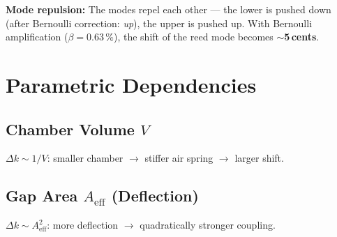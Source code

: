 \documentclass[11pt,a4paper]{article}
\begin{document}
\textbf{Mode repulsion:} The modes repel each other --- the lower is pushed down (after Bernoulli correction: \textit{up}), the upper is pushed up. With Bernoulli amplification ($\beta = 0{.}63\,\%$), the shift of the reed mode becomes \textbf{$\sim$5\,cents}.

\section{Parametric Dependencies}

\subsection{Chamber Volume $V$}

$\Delta k \sim 1/V$: smaller chamber $\to$ stiffer air spring $\to$ larger shift.

\begin{table}[H]
\centering\small
{}
\caption{Frequency shift as a function of chamber volume}
\end{table}

\subsection{Gap Area $A_\text{eff}$ (Deflection)}

$\Delta k \sim A_\text{eff}^2$: more deflection $\to$ quadratically stronger coupling.

\begin{table}[H]
\centering\small
{}
\caption{Frequency shift as a function of reed deflection (chamber 180\,cm$^3$)}
\end{table}
\end{document}
